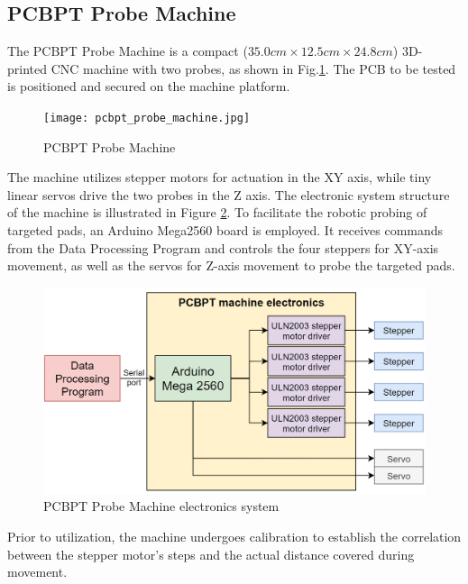 \documentclass[sigconf]{acmart}
\begin{document}
\subsection{PCBPT Probe Machine}
The PCBPT Probe Machine is a compact ($35.0cm \times 12.5cm \times 24.8cm$) 3D-printed CNC machine with two probes, as shown in Fig.\ref{machine}. The PCB to be tested is positioned and secured on the machine platform.

\begin{figure}[h]
  \centering
  \texttt{[image: pcbpt\_probe\_machine.jpg]}
  \caption{PCBPT Probe Machine}
  \label{machine}
\end{figure}

The machine utilizes stepper motors for actuation in the XY axis, while tiny linear servos drive the two probes in the Z axis. The electronic system structure of the machine is illustrated in Figure \ref{electronics_structure}. To facilitate the robotic probing of targeted pads, an Arduino Mega2560 board is employed. It receives commands from the Data Processing Program and controls the four steppers for XY-axis movement, as well as the servos for Z-axis movement to probe the targeted pads.

\begin{figure}[h]
  \centering
  \includegraphics[width=\linewidth]{electronics_structure.png}
  \caption{PCBPT Probe Machine electronics system}
  \label{electronics_structure}
\end{figure}

Prior to utilization, the machine undergoes calibration to establish the correlation between the stepper motor's steps and the actual distance covered during movement.
\end{document}
